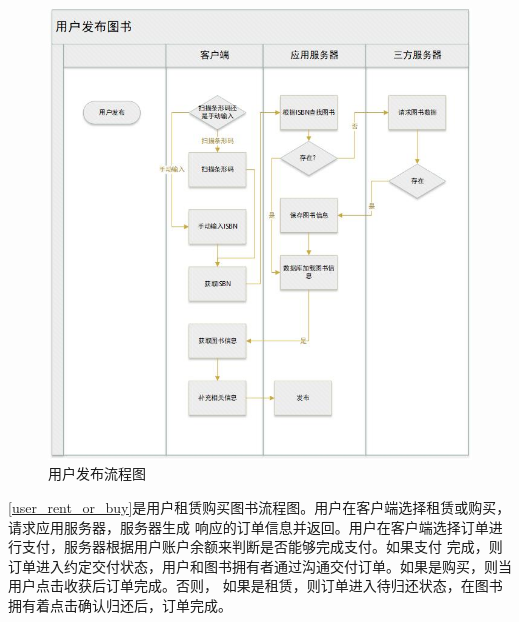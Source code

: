 \begin{figure}[h]
	\centering
	\includegraphics[scale=0.7]{Chapters/UML/user_release.jpg}
	\caption{用户发布流程图}
	\label{user_release}
\end{figure}

\cref{user_rent_or_buy}是用户租赁购买图书流程图。用户在客户端选择租赁或购买，请求应用服务器，服务器生成
响应的订单信息并返回。用户在客户端选择订单进行支付，服务器根据用户账户余额来判断是否能够完成支付。如果支付
完成，则订单进入约定交付状态，用户和图书拥有者通过沟通交付订单。如果是购买，则当用户点击收获后订单完成。否则，
如果是租赁，则订单进入待归还状态，在图书拥有着点击确认归还后，订单完成。

